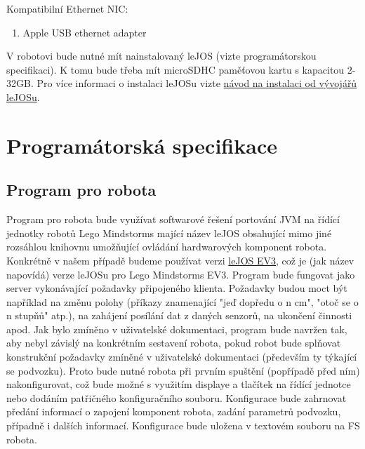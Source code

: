 \documentclass[12pt, ngerman]{article}
\begin{document}
Kompatibilní Ethernet NIC:
\begin{enumerate}[leftmargin=5mm]
\item Apple USB ethernet adapter
\end{enumerate}

V robotovi bude nutné mít nainstalovaný leJOS (vizte programátorskou specifikaci).
K tomu bude třeba mít microSDHC paměťovou kartu s kapacitou 2-32GB. Pro více informaci o instalaci leJOSu vizte \href{https://sourceforge.net/p/lejos/wiki/Windows Installation/}{návod na instalaci od vývojářů leJOSu}.

\section{Programátorská specifikace}
\subsection{Program pro robota}
Program pro robota bude využívat softwarové řešení portování JVM na řídící jednotky robotů Lego Mindstorms mající název leJOS obsahující mimo jiné rozsáhlou knihovnu umožňující ovládání hardwarových komponent robota. Konkrétně v našem případě budeme používat verzi \href{http://www.lejos.org/ev3.php}{leJOS EV3}, což je (jak název napovídá) verze leJOSu pro Lego Mindstorms EV3. Program bude fungovat jako server vykonávající požadavky připojeného klienta. Požadavky budou moct být například na změnu polohy (příkazy znamenající "jeď dopředu o n cm", "otoč se o n stupňů" atp.), na zahájení posílání dat z daných senzorů, na ukončení činnosti apod. Jak bylo zmíněno v uživatelské dokumentaci, program bude navržen tak, aby nebyl závislý na konkrétním sestavení robota, pokud robot bude splňovat konstrukční požadavky zmíněné v uživatelské dokumentaci (především ty týkající se podvozku). Proto bude nutné robota při prvním spuštění (popřípadě před ním) nakonfigurovat, což bude možné s využitím displaye a tlačítek na řídící jednotce nebo dodáním patřičného konfiguračního souboru. Konfigurace bude zahrnovat předání informací o zapojení komponent robota, zadání parametrů podvozku, případně i dalších informací. Konfigurace bude uložena v textovém souboru na FS robota.
\end{document}
